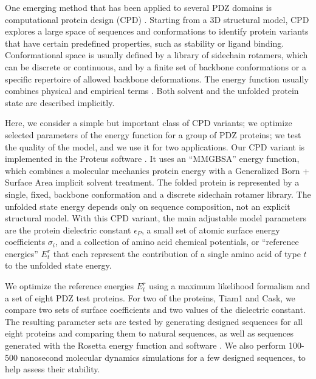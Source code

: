 \documentclass[12pt]{article}
\begin{document}
One emerging method that has been applied to several PDZ domains is computational protein design (CPD) \cite{Kuhlman06,
Lippow07,Dai10,Feldmeier13,Tinberg13,Au16}. Starting from a 3D structural model, CPD explores a large space of sequences and
conformations to identify protein variants that have certain predefined properties, such as stability or ligand binding.
Conformational space is usually defined by a library of sidechain rotamers, which can be discrete or continuous, and by
a finite set of backbone conformations or a specific repertoire of allowed backbone deformations. The energy function
usually combines physical and empirical terms \cite{Pokala04,Samish11,Li13}. Both solvent and the unfolded protein state
are described implicitly. 

Here, we consider a simple but important class of CPD variants; we optimize selected parameters of the energy function for
a group of PDZ proteins; we test the quality of the model, and we use it for two applications. Our CPD variant is implemented
in the Proteus software \cite{Schmidt08,Simonson13b,Polydorides16}. It uses an ``MMGBSA'' energy function, which combines
a molecular mechanics protein energy with a Generalized Born + Surface Area implicit solvent treatment. The folded protein
is represented by a single, fixed, backbone conformation and a discrete sidechain rotamer library. The unfolded state energy
depends only on sequence composition, not an explicit structural model. With this CPD variant, the main adjustable model
parameters are the protein dielectric constant $\epsilon_P$, a small set of atomic surface energy coefficients $\sigma_i$, and
a collection of amino acid chemical potentials, or ``reference energies'' $E^r_t$ that each represent the contribution of a
single amino acid of type $t$ to the unfolded state energy.

We optimize the reference energies $E^r_t$ using a maximum likelihood formalism and a set of eight PDZ test proteins. For two
of the proteins, Tiam1 and Cask, we compare two sets of surface coefficients and two values of the dielectric constant. The
resulting parameter sets are tested by generating designed sequences for all eight proteins and comparing them to natural
sequences, as well as sequences generated with the Rosetta energy function and software \cite{Baker06b}. We also perform
100-500 nanosecond molecular dynamics simulations for a few designed sequences, to help assess their stability.
\end{document}
